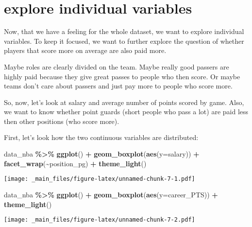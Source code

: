 \documentclass[
]{book}
\newenvironment{Shaded}{\begin{snugshade}}{\end{snugshade}}
\newcommand{\AttributeTok}[1]{\textcolor[rgb]{0.13,0.29,0.53}{#1}}
\newcommand{\FunctionTok}[1]{\textcolor[rgb]{0.13,0.29,0.53}{\textbf{#1}}}
\newcommand{\NormalTok}[1]{#1}
\newcommand{\SpecialCharTok}[1]{\textcolor[rgb]{0.81,0.36,0.00}{\textbf{#1}}}
\begin{document}
\hypertarget{explore-individual-variables}{%
\section{explore individual variables}\label{explore-individual-variables}}

Now, that we have a feeling for the whole dataset, we want to explore individual
variables. To keep it focused, we want to further explore the question
of whether players that score more on average are also paid more.

Maybe roles are clearly divided on the team. Maybe really good passers are highly
paid because they give great passes to people who then score. Or maybe teams
don't care about passers and just pay more to people who score more.

So, now, let's look at salary and average number of points scored by game.
Also, we want to know whether point guards (short people who pass a lot) are
paid less then other positions (who score more).

First, let's look how the two continuous variables are distributed:

\begin{Shaded}
\begin{Highlighting}[]
\NormalTok{data\_nba }\SpecialCharTok{\%\textgreater{}\%} \FunctionTok{ggplot}\NormalTok{() }\SpecialCharTok{+} 
\FunctionTok{geom\_boxplot}\NormalTok{(}\FunctionTok{aes}\NormalTok{(}\AttributeTok{y=}\NormalTok{salary)) }\SpecialCharTok{+}
  \FunctionTok{facet\_wrap}\NormalTok{(}\SpecialCharTok{\textasciitilde{}}\NormalTok{position\_pg) }\SpecialCharTok{+}
  \FunctionTok{theme\_light}\NormalTok{()}
\end{Highlighting}
\end{Shaded}

\texttt{[image: \_main\_files/figure-latex/unnamed-chunk-7-1.pdf]}

\begin{Shaded}
\begin{Highlighting}[]
\NormalTok{data\_nba }\SpecialCharTok{\%\textgreater{}\%} \FunctionTok{ggplot}\NormalTok{() }\SpecialCharTok{+} 
\FunctionTok{geom\_boxplot}\NormalTok{(}\FunctionTok{aes}\NormalTok{(}\AttributeTok{y=}\NormalTok{career\_PTS)) }\SpecialCharTok{+} 
  \FunctionTok{theme\_light}\NormalTok{()}
\end{Highlighting}
\end{Shaded}

\texttt{[image: \_main\_files/figure-latex/unnamed-chunk-7-2.pdf]}
\end{document}
